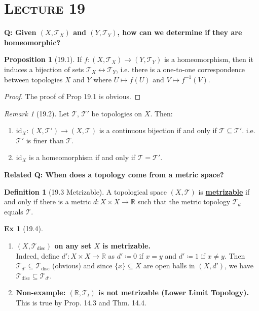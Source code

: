 \documentclass{article}
\newcommand{\R}{\ensuremath{\mathbb{R}}}
\newcommand{\Iff}{if and only if}
\newcommand{\coleq}{\ensuremath{\coloneqq}}
\newcommand{\define}[1]{\textbf{\underline{#1}}}
\newcommand{\func}[3]{\ensuremath{#1: #2 \to #3}}
\newcommand{\id}{\ensuremath{\mathrm{id}}}
\newcommand{\tp}{\ensuremath{\mathcal{T}}}
\newcommand{\Ts}[2]{\ensuremath{(#1,#2)}}
\newcommand{\tpdisc}{\ensuremath{\tp_\text{disc}}}
\renewcommand{\Subset}{\subseteq}
\theoremstyle{definition}
\newtheorem*{defn}{Definition}
\newtheorem*{prop}{Proposition}
\newtheorem*{ex}{Ex}
\theoremstyle{remark}
\newtheorem*{rmk}{Remark}
\begin{document}
    \noindent\section*{\textbf{\textsc{Lecture 19}}}{
        \textbf{Q: Given $\Ts{X}{\tp_X}$ and $\Ts{Y}{\tp_Y}$, how can we determine if they are homeomorphic?}

        \begin{prop}[19.1]
            If $\func{f}{\Ts{X}{\tp_X}}{\Ts{Y}{\tp_Y}}$ is a homeomorphism, then it induces a bijection of sets $\tp_X \leftrightarrow \tp_Y$, i.e. there is a one-to-one correspondence between topologies $X$ and $Y$ where $U \mapsto f(U)$ and $V \mapsto f^{-1}(V)$.
        \end{prop}
    
        \begin{proof}
            The proof of Prop 19.1 is obvious.
        \end{proof}
    
        \begin{rmk}[19.2]
            Let $\tp, \, \tp'$ be topologies on $X$. Then:
            \begin{enumerate}
                \item $\func{\id_X}{\Ts{X}{\tp'}}{\Ts{X}{\tp}}$ is a continuous bijection \Iff{} $\tp \Subset \tp'$. i.e. $\tp'$ is finer than $\tp$.
                \item $\id_X$ is a homeomorphism \Iff{} $\tp=\tp'$.
            \end{enumerate}
        \end{rmk}
    
        \noindent\textbf{Related Q: When does a topology come from a metric space?}
    
        \begin{defn}[19.3 Metrizable]
            A topological space $\Ts{X}{\tp}$ is \define{metrizable} \Iff{} there is a metric $\func{d}{X\times X}{\R}$ such that the metric topology $\tp_d$ equals $\tp$.
        \end{defn}
    
        \begin{ex}[19.4]\hfill
            \begin{enumerate}
                \item \textbf{$\Ts{X}{\tpdisc}$ on any set $X$ is metrizable.}\\
                Indeed, define $\func{d'}{X\times X}{\R}$ as $d'\coleq 0$ if $x=y$ and $d'\coleq 1$ if $x\neq y$. Then $\tp_{d'} \Subset \tpdisc$ (obvious) and since $\{x\} \Subset X$ are open balls in $\Ts{X}{d'}$, we have $\tpdisc \Subset \tp_{d'}$.
                \item \textbf{Non-example: $\Ts{\R}{\tp_l}$ is not metrizable (Lower Limit Topology).}\\
                This is true by Prop. 14.3 and Thm. 14.4.
            \end{enumerate}
        \end{ex}
}
\end{document}
